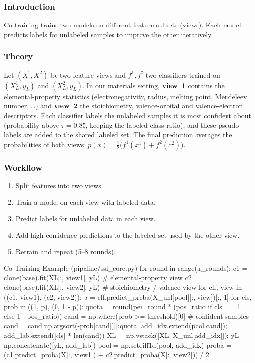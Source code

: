 \subsubsection{Introduction}
Co-training trains two models on different feature subsets (views). Each model predicts labels
for unlabeled samples to improve the other iteratively.

\subsubsection{Theory}
Let $(X^1, X^2)$ be two feature views and $f^1, f^2$ two classifiers trained on
$(X^1_L, y_L)$ and $(X^2_L, y_L)$. In our materials setting, \textbf{view~1} contains the
elemental-property statistics (electronegativity, radius, melting point, Mendeleev number,
\dots) and \textbf{view~2} the stoichiometry, valence-orbital and valence-electron descriptors.
Each classifier labels the unlabeled samples it is most confident about (probability above
$\tau=0.85$, keeping the labeled class ratio), and these pseudo-labels are added to the shared
labeled set. The final prediction averages the probabilities of both views:
$p(x) = \tfrac{1}{2}\big(f^1(x^1) + f^2(x^2)\big)$.

\subsubsection{Workflow}
\begin{enumerate}
  \item Split features into two views.
  \item Train a model on each view with labeled data.
  \item Predict labels for unlabeled data in each view.
  \item Add high-confidence predictions to the labeled set used by the other view.
  \item Retrain and repeat (5--8 rounds).
\end{enumerate}

\begin{pycode}{Co-Training Example (pipeline/ssl\_core.py)}
for round in range(n_rounds):
    c1 = clone(base).fit(XL[:, view1], yL)      # elemental-property view
    c2 = clone(base).fit(XL[:, view2], yL)      # stoichiometry / valence view
    for clf, view in ((c1, view1), (c2, view2)):
        p = clf.predict_proba(X_unl[pool][:, view])[:, 1]
        for cls, prob in ((1, p), (0, 1 - p)):
            quota = round(per_round * (pos_ratio if cls == 1 else 1 - pos_ratio))
            cand = np.where(prob >= threshold)[0]                 # confident samples
            cand = cand[np.argsort(-prob[cand])][:quota]
            add_idx.extend(pool[cand]); add_lab.extend([cls] * len(cand))
    XL = np.vstack([XL, X_unl[add_idx]]); yL = np.concatenate([yL, add_lab])
    pool = np.setdiff1d(pool, add_idx)
proba = (c1.predict_proba(X[:, view1]) + c2.predict_proba(X[:, view2])) / 2
\end{pycode}

